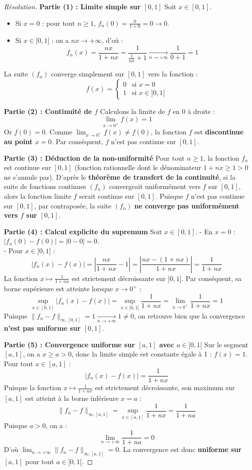 \documentclass[12pt,a4paper]{report}
\begin{document}
\begin{proof}[Résolution]
\textbf{Partie (1) : Limite simple sur $[0, 1]$}
Soit $x \in [0, 1]$.
\begin{itemize}
    \item Si $x = 0$ : pour tout $n \ge 1$, $f_n(0) = \frac{0}{1+0} = 0 \to 0$.
    \item Si $x \in ]0, 1]$ : on a $nx \to +\infty$, d'où :
    \[ f_n(x) = \frac{nx}{1+nx} = \frac{1}{\frac{1}{nx} + 1} \xrightarrow[n \to +\infty]{} \frac{1}{0 + 1} = 1 \]
\end{itemize}
La suite $(f_n)$ converge simplement sur $[0, 1]$ vers la fonction :
\[ f(x) = \begin{cases} 0 & \text{si } x = 0 \\ 1 & \text{si } x \in ]0, 1] \end{cases} \]

\textbf{Partie (2) : Continuité de $f$}
Calculons la limite de $f$ en 0 à droite :
\[ \lim_{x \to 0^+} f(x) = 1 \]
Or $f(0) = 0$. Comme $\lim_{x \to 0^+} f(x) \neq f(0)$, la fonction $f$ est \textbf{discontinue au point $x = 0$}. Par conséquent, $f$ n'est pas continue sur $[0, 1]$.

\textbf{Partie (3) : Déduction de la non-uniformité}
Pour tout $n \ge 1$, la fonction $f_n$ est continue sur $[0, 1]$ (fonction rationnelle dont le dénominateur $1+nx \ge 1 > 0$ ne s'annule pas).
D'après le \textbf{théorème de transfert de la continuité}, si la suite de fonctions continues $(f_n)$ convergeait uniformément vers $f$ sur $[0, 1]$, alors la fonction limite $f$ serait continue sur $[0, 1]$.
Puisque $f$ n'est pas continue sur $[0, 1]$, par contraposée, la suite $(f_n)$ \textbf{ne converge pas uniformément vers $f$ sur $[0, 1]$}.

\textbf{Partie (4) : Calcul explicite du supremum}
Soit $x \in [0, 1]$. 
- En $x = 0$ : $|f_n(0) - f(0)| = |0 - 0| = 0$.\\
- Pour $x \in ]0, 1]$ :
\[ |f_n(x) - f(x)| = \left| \frac{nx}{1+nx} - 1 \right| = \left| \frac{nx - (1+nx)}{1+nx} \right| = \frac{1}{1+nx} \]
La fonction $x \mapsto \frac{1}{1+nx}$ est strictement décroissante sur $]0, 1]$. Par conséquent, sa borne supérieure est atteinte lorsque $x \to 0^+$ :
\[ \sup_{x \in [0, 1]} |f_n(x) - f(x)| = \sup_{x \in ]0, 1]} \frac{1}{1+nx} = \lim_{x \to 0^+} \frac{1}{1+nx} = 1 \]
Puisque $\|f_n - f\|_{\infty, [0, 1]} = 1 \xrightarrow[n \to +\infty]{} 1 \neq 0$, on retrouve bien que la convergence \textbf{n'est pas uniforme sur $[0, 1]$}.

\textbf{Partie (5) : Convergence uniforme sur $[a, 1]$ avec $a \in ]0, 1[$}
Sur le segment $[a, 1]$, on a $x \ge a > 0$, donc la limite simple est constante égale à 1 : $f(x) = 1$.
Pour tout $x \in [a, 1]$ :
\[ |f_n(x) - f(x)| = \frac{1}{1+nx} \]
Puisque la fonction $x \mapsto \frac{1}{1+nx}$ est strictement décroissante, son maximum sur $[a, 1]$ est atteint à la borne inférieure $x = a$ :
\[ \|f_n - f\|_{\infty, [a, 1]} = \sup_{x \in [a, 1]} \frac{1}{1+nx} = \frac{1}{1+na} \]
Puisque $a > 0$, on a :
\[ \lim_{n \to +\infty} \frac{1}{1+na} = 0 \]
D'où $\lim_{n \to +\infty} \|f_n - f\|_{\infty, [a, 1]} = 0$.
La convergence est donc \textbf{uniforme sur $[a, 1]$} pour tout $a \in ]0, 1[$.
\end{proof}
\end{document}
